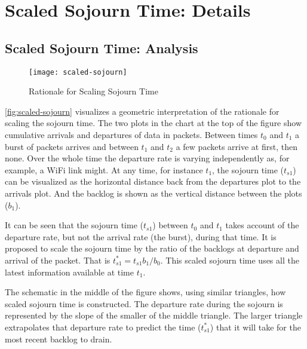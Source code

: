 \section{Scaled Sojourn Time: Details}\label{sec:scaled_sojourn_details}

\subsection{Scaled Sojourn Time: Analysis}\label{sec:scaled_sojourn_analysis}

\begin{figure}[h]
	\centering
	\texttt{[image: scaled-sojourn]}
	\caption{Rationale for Scaling Sojourn Time}\label{fig:scaled-sojourn}
\end{figure}

\autoref{fig:scaled-sojourn} visualizes a geometric interpretation of the rationale for scaling the sojourn time. The two plots in the chart at the top of the figure show cumulative arrivals and departures of data in packets. Between times \(t_0\) and \(t_1\) a burst of packets arrives and between \(t_1\) and \(t_2\) a few packets arrive at first, then none. Over the whole time the departure rate is varying independently as, for example, a WiFi link might. At any time, for instance \(t_1\), the sojourn time  (\(t_{s1}\)) can be visualized as the horizontal distance back from the departures plot to the arrivals plot. And the backlog is shown as the vertical distance between the plots (\(b_1\)).

It can be seen that the sojourn time (\(t_{s1}\)) between \(t_0\) and \(t_1\) takes account of the departure rate, but not the arrival rate (the burst), during that time. It is proposed to scale the sojourn time by the ratio of the backlogs at departure and arrival of the packet. That is \(t_{s1}^* = t_{s1} b_1/b_0\). This scaled sojourn time uses all the latest information available at time \(t_1\). 

The schematic in the middle of the figure shows, using similar triangles, how scaled sojourn time is constructed.  The departure rate during the sojourn is represented by the slope of the smaller of the middle triangle. The larger triangle extrapolates that departure rate to predict the time (\(t_{s1}^*\)) that it will take for the most recent backlog to drain.

